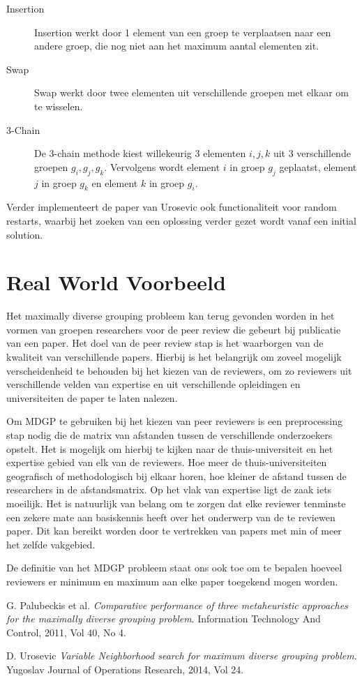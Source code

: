 \documentclass[pdftex,12pt,a4paper]{article}
\begin{document}
\begin{description}
\item[Insertion] Insertion werkt door 1 element van een groep te verplaatsen naar een andere groep, die nog niet aan het maximum aantal elementen zit.
\item[Swap] Swap werkt door twee elementen uit verschillende groepen met elkaar om te wisselen.
\item[3-Chain] De 3-chain methode kiest willekeurig 3 elementen $i, j, k$ uit 3 verschillende groepen $g_{i}, g_{j}, g_{k}$. Vervolgens wordt element $i$ in groep $g_{j}$ geplaatst, element $j$ in groep $g_{k}$ en element $k$ in groep $g_{i}$.
\end{description}

Verder implementeert de paper van Urosevic\cite{Urosevic} ook functionaliteit voor random restarts, waarbij het zoeken van een oplossing verder gezet wordt vanaf een initial solution.

\section{Real World Voorbeeld}

Het maximally diverse grouping probleem kan terug gevonden worden in het vormen van groepen researchers voor de peer review die gebeurt bij publicatie van een paper. Het doel van de peer review stap is het waarborgen van de kwaliteit van verschillende papers. Hierbij is het belangrijk om zoveel mogelijk verscheidenheid te behouden bij het kiezen van de reviewers, om zo reviewers uit verschillende velden van expertise en uit verschillende opleidingen en universiteiten de paper te laten nalezen.

Om MDGP te gebruiken bij het kiezen van peer reviewers is een preprocessing stap nodig die de matrix van afstanden tussen de verschillende onderzoekers opstelt. Het is mogelijk om hierbij te kijken naar de thuis-universiteit en het expertise gebied van elk van de reviewers. Hoe meer de thuis-universiteiten geografisch of methodologisch bij elkaar horen, hoe kleiner de afstand tussen de researchers in de afstandsmatrix. Op het vlak van expertise ligt de zaak iets moeilijk. Het is natuurlijk van belang om te zorgen dat elke reviewer tenminste een zekere mate aan basiskennis heeft over het onderwerp van de te reviewen paper. Dit kan bereikt worden door te vertrekken van papers met min of meer het zelfde vakgebied.

De definitie van het MDGP probleem staat ons ook toe om te bepalen hoeveel reviewers er minimum en maximum aan elke paper toegekend mogen worden. 

\newpage
\begin{thebibliography}{9}
  G. Palubeckis et al.
  \emph{Comparative performance of three metaheuristic approaches
for the maximally diverse grouping problem}.
  Information Technology And Control, 2011, Vol 40, No 4.
  
 D. Urosevic
 \emph{Variable Neighborhood search for maximum diverse grouping problem}.
 Yugoslav Journal of Operations Research, 2014, Vol 24.

\end{thebibliography}
\end{document}

